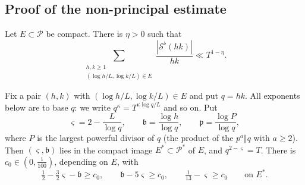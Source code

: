 \documentclass[11pt,colorlinks]{charlie}
\begin{document}
\subsection{Proof of the non-principal estimate}
\begin{proposition}\label{prop:nonprincipal}
Let $E\subset\mathcal P$ be compact. There is $\eta>0$ such that
\[
 \sum_{\substack{h,k\ge1\\(\log h/L,\log k/L)\in E}}\frac{|\mathcal S^\flat(hk)|}{hk}\ll T^{1-\eta}.
\]
\end{proposition}

Fix a pair $(h,k)$ with $(\log h/L,\log k/L)\in E$ and put $q=hk$. All exponents below are to base $q$: we write $q^\kappa=T^{\kappa\log q/L}$ and so on. Put
\[
 \varsigma=2-\frac{L}{\log q},\qquad\mathfrak b=\frac{\log h}{\log q},\qquad\mathfrak p=\frac{\log P}{\log q},
\]
where $P$ is the largest powerful divisor of $q$ (the product of the $p^a\Vert q$ with $a\ge2$). Then $(\varsigma,\mathfrak b)$ lies in the compact image $E^*\subset\mathcal P^*$ of $E$, and $q^{2-\varsigma}=T$. There is $c_0\in(0,\frac1{100})$, depending on $E$, with
\begin{equation}\label{eq:margins}
 \tfrac12-\tfrac32\varsigma-\mathfrak b\ge c_0,\qquad\mathfrak b-5\varsigma\ge c_0,\qquad\tfrac1{13}-\varsigma\ge c_0\qquad\text{on }E^*.
\end{equation}
\end{document}
